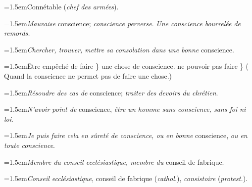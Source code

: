 \par{\dictfontsize\hangindent=1.5em\noindent Connétable (\textit{chef des armées}). \par}
\par{\dictfontsize\hangindent=1.5em\noindent \textit{Mauvaise} conscience; \textit{conscience perverse}. \textit{Une conscience bourrelée de remords.} \par}
\par{\dictfontsize\hangindent=1.5em\noindent \textit{Chercher, trouver, mettre sa consolation dans une bonne} conscience. \par}
\par{\dictfontsize\hangindent=1.5em\noindent Être empêché de faire \} une chose de conscience. ne pouvoir pas faire \} ( Quand la conscience ne permet pas de faire une chose.) \par}
\par{\dictfontsize\hangindent=1.5em\noindent \textit{Résoudre des cas de} conscience; \textit{traiter des devoirs du chrétien}. \par}
\par{\dictfontsize\hangindent=1.5em\noindent \textit{N’avoir point de} conscience, \textit{être un homme sans conscience, sans foi ni loi}. \par}
\par{\dictfontsize\hangindent=1.5em\noindent \textit{Je puis faire cela en sûreté de conscience, ou en bonne} conscience, \textit{ou en toute conscience}. \par}
\par{\dictfontsize\hangindent=1.5em\noindent \textit{Membre du conseil ecclésiastique, membre du} conseil de fabrique. \par}
\par{\dictfontsize\hangindent=1.5em\noindent \textit{Conseil ecclésiastique}, conseil de fabrique (\textit{cathol.}), \textit{consistoire} (\textit{protest.}). \par}

